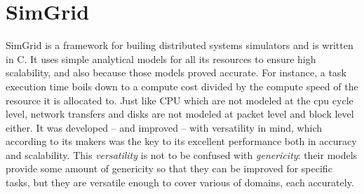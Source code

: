 %
%
%
%
%
%
%
\section{SimGrid}

SimGrid \cite{casanova:hal-01017319} is a framework for builing distributed
systems simulators and is written in C. It uses simple analytical models for
all its resources to ensure high scalability, and also because those models
proved accurate. For instance, a task execution time boils down to a compute
cost divided by the compute speed of the resource it is allocated to. Just like
CPU which are not modeled at the cpu cycle level, network transfers and disks
are not modeled at packet level and block level either.  It was developed --
and improved -- with versatility in mind, which according to its makers was the
key to its excellent performance both in accuracy and scalability. This
\textit{versatility} is not to be confused with \textit{genericity}: their
models provide some amount of genericity so that they can be improved for
specific tasks, but they are versatile enough to cover various of domains, each
accurately. 

